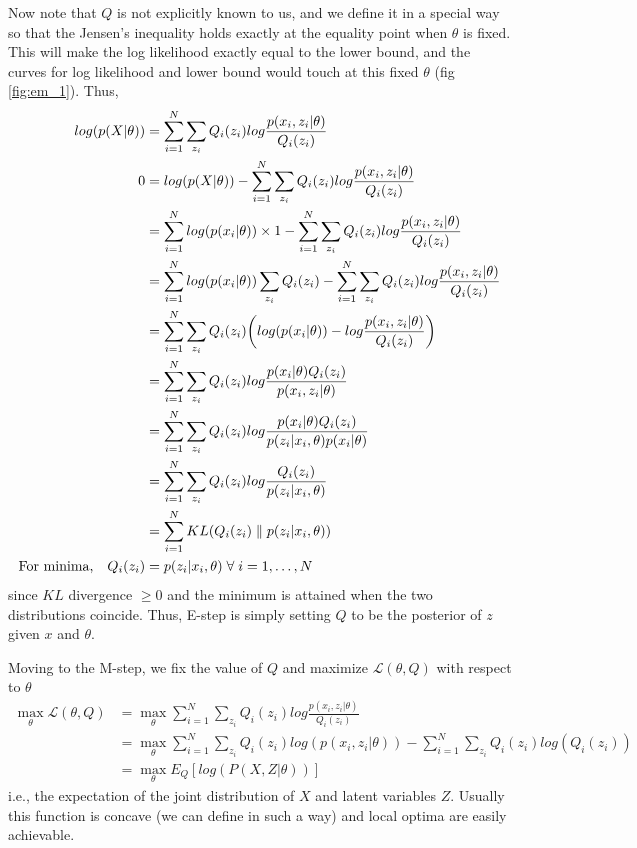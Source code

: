\documentclass[../../statistical_learning_notes.tex]{subfiles}
\begin{document}
Now note that $Q$ is not explicitly known to us, and we define it in a special way so that the Jensen's inequality holds exactly at the equality point when $\theta$ is fixed. This will make the log likelihood exactly equal to the lower bound, and the curves for log likelihood and lower bound would touch at this fixed $\theta$ (fig \ref{fig:em_1}). Thus,
\begin{align*}
    log(p(X|\theta)) &= \sum_{i=1}^{N} \sum_{z_{i}} Q_{i}(z_{i}) log \frac{p(x_{i}, z_{i}|\theta)}{Q_{i}(z_{i})}\\
    0 &= log(p(X|\theta)) - \sum_{i=1}^{N} \sum_{z_{i}} Q_{i}(z_{i}) log \frac{p(x_{i}, z_{i}|\theta)}{Q_{i}(z_{i})}\\
    &= \sum_{i=1}^{N}log(p(x_{i}|\theta)) \times 1 - \sum_{i=1}^{N} \sum_{z_{i}} Q_{i}(z_{i}) log \frac{p(x_{i}, z_{i}|\theta)}{Q_{i}(z_{i})}\\
    &= \sum_{i=1}^{N}log(p(x_{i}|\theta)) \sum_{z_{i}}Q_{i}(z_{i}) - \sum_{i=1}^{N} \sum_{z_{i}} Q_{i}(z_{i}) log \frac{p(x_{i}, z_{i}|\theta)}{Q_{i}(z_{i})}\\
    &= \sum_{i=1}^{N} \sum_{z_{i}}Q_{i}(z_{i}) \bigg( log(p(x_{i}|\theta)) - log \frac{p(x_{i}, z_{i}|\theta)}{Q_{i}(z_{i})} \bigg)\\
    &= \sum_{i=1}^{N} \sum_{z_{i}}Q_{i}(z_{i}) log \frac{p(x_{i}|\theta) Q_{i}(z_{i})}{p(x_{i}, z_{i}|\theta)}\\
    &= \sum_{i=1}^{N} \sum_{z_{i}}Q_{i}(z_{i}) log \frac{p(x_{i}|\theta) Q_{i}(z_{i})}{p(z_{i}|x_{i},\theta)p(x_{i}|\theta)}\\
    &= \sum_{i=1}^{N} \sum_{z_{i}}Q_{i}(z_{i}) log\frac{Q_{i}(z_{i})}{p(z_{i}|x_{i},\theta)}\\
    &= \sum_{i=1}^{N} KL(Q_{i}(z_{i}) \parallel p(z_{i}|x_{i},\theta))\\
    \text{For minima,} \quad Q_{i}(z_{i}) &= p(z_{i}|x_{i},\theta) \; \forall \; i = 1,\ldots,N
\end{align*}
since $KL$ divergence $\geq 0$ and the minimum is attained when the two distributions coincide. Thus, E-step is simply setting $Q$ to be the posterior of $z$ given $x$ and $\theta$.\newline

Moving to the M-step, we fix the value of $Q$ and maximize $\mathcal{L}(\theta, Q)$ with respect to $\theta$
\begin{align*}
    \max_{\theta}\mathcal{L}(\theta, Q) &= \max_{\theta} \sum_{i=1}^{N} \sum_{z_{i}} Q_{i}(z_{i}) log \frac{p(x_{i}, z_{i}|\theta)}{Q_{i}(z_{i})}\\
    &= \max_{\theta} \sum_{i=1}^{N} \sum_{z_{i}} Q_{i}(z_{i}) log(p(x_{i}, z_{i}|\theta)) - \sum_{i=1}^{N} \sum_{z_{i}} Q_{i}(z_{i})log(Q_{i}(z_{i}))\\
    &= \max_{\theta} E_{Q}[log(P(X, Z|\theta))]
\end{align*}
i.e., the expectation of the joint distribution of $X$ and latent variables $Z$. Usually this function is concave (we can define in such a way) and local optima are easily achievable.\newline
\end{document}
